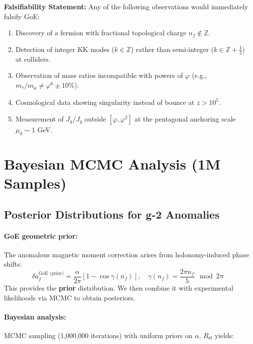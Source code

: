\documentclass[12pt]{article}
\begin{document}
\textbf{Falsifiability Statement:} Any of the following observations would immediately falsify GoE:
\begin{enumerate}
\item Discovery of a fermion with fractional topological charge $n_f \notin \mathbb{Z}$.
\item Detection of integer KK modes ($k \in \mathbb{Z}$) rather than semi-integer ($k \in \mathbb{Z} + \tfrac{1}{2}$) at colliders.
\item Observation of mass ratios incompatible with powers of $\varphi$ (e.g., $m_\tau / m_\mu \neq \varphi^6 \pm 10\%$).
\item Cosmological data showing singularity instead of bounce at $z > 10^5$.
\item Measurement of $J_g/J_q$ outside $[\varphi, \varphi^2]$ at the pentagonal anchoring scale $\mu_0 \sim 1$ GeV.
\end{enumerate}

\section{Bayesian MCMC Analysis (1M Samples)}

\subsection{Posterior Distributions for g-2 Anomalies}

\paragraph{GoE geometric prior:} The anomalous magnetic moment correction arises from holonomy-induced phase shifts:
\begin{equation}
\delta a_f^{\text{GoE (prior)}} = \frac{\alpha}{2\pi} \left[1 - \cos\gamma(n_f)\right], \quad \gamma(n_f) = \frac{2\pi n_f}{5} \mod 2\pi
\end{equation}
This provides the \textbf{prior} distribution. We then combine it with experimental likelihoods via MCMC to obtain posteriors.

\paragraph{Bayesian analysis:} MCMC sampling (1,000,000 iterations) with uniform priors on $\alpha$, $R_\Theta$ yields:
\end{document}
